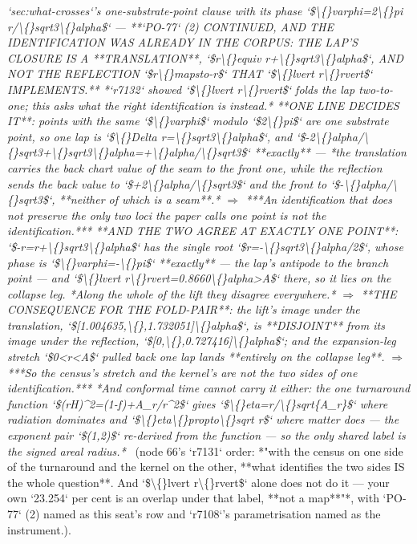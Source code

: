 \begin{description}
\textit{`sec:what-crosses`'s one-substrate-point clause with its phase `\$\textbackslash\{\}varphi=2\textbackslash\{\}pi r/\textbackslash\{\}sqrt3\textbackslash\{\}alpha\$` ---  **`PO-77` (2) CONTINUED, AND THE IDENTIFICATION WAS ALREADY IN THE CORPUS: THE LAP'S CLOSURE IS A **TRANSLATION**, `\$r\textbackslash\{\}equiv r+\textbackslash\{\}sqrt3\textbackslash\{\}alpha\$`, AND NOT THE REFLECTION `\$r\textbackslash\{\}mapsto-r\$` THAT `\$\textbackslash\{\}lvert r\textbackslash\{\}rvert\$` IMPLEMENTS.** *`r7132` showed `\$\textbackslash\{\}lvert r\textbackslash\{\}rvert\$` folds the lap two-to-one; this asks what the right identification is instead.*  **ONE LINE DECIDES IT**: points with the same `\$\textbackslash\{\}varphi\$` modulo `\$2\textbackslash\{\}pi\$` are one substrate point, so one lap is `\$\textbackslash\{\}Delta r=\textbackslash\{\}sqrt3\textbackslash\{\}alpha\$`, and `\$-2\textbackslash\{\}alpha/\textbackslash\{\}sqrt3+\textbackslash\{\}sqrt3\textbackslash\{\}alpha=+\textbackslash\{\}alpha/\textbackslash\{\}sqrt3\$` **exactly** --- *the translation carries the back chart value of the seam to the front one, while the reflection sends the back value to `\$+2\textbackslash\{\}alpha/\textbackslash\{\}sqrt3\$` and the front to `\$-\textbackslash\{\}alpha/\textbackslash\{\}sqrt3\$`, **neither of which is a seam**.* \ensuremath{\Rightarrow} ***An identification that does not preserve the only two loci the paper calls one point is not the identification.***  **AND THE TWO AGREE AT EXACTLY ONE POINT**: `\$-r=r+\textbackslash\{\}sqrt3\textbackslash\{\}alpha\$` has the single root `\$r=-\textbackslash\{\}sqrt3\textbackslash\{\}alpha/2\$`, whose phase is `\$\textbackslash\{\}varphi=-\textbackslash\{\}pi\$` **exactly** --- the lap's antipode to the branch point --- and `\$\textbackslash\{\}lvert r\textbackslash\{\}rvert=0.8660\textbackslash\{\}alpha>A\$` there, so it lies on the collapse leg. *Along the whole of the lift they disagree everywhere.* \ensuremath{\Rightarrow} **THE CONSEQUENCE FOR THE FOLD-PAIR**: the lift's image under the translation, `\$[1.004635,\textbackslash\{\},1.732051]\textbackslash\{\}alpha\$`, is **DISJOINT** from its image under the reflection, `\$[0,\textbackslash\{\},0.727416]\textbackslash\{\}alpha\$`; and the expansion-leg stretch `\$0<r<A\$` pulled back one lap lands **entirely on the collapse leg**. \ensuremath{\Rightarrow} ***So the census's stretch and the kernel's are not the two sides of one identification.***  *And conformal time cannot carry it either: the one turnaround function `\$(rH)\textasciicircum{}2=(1-f)+A\_r/r\textasciicircum{}2\$` gives `\$\textbackslash\{\}eta=r/\textbackslash\{\}sqrt\{A\_r\}\$` where radiation dominates and `\$\textbackslash\{\}eta\textbackslash\{\}propto\textbackslash\{\}sqrt r\$` where matter does --- the exponent pair `\$(1,2)\$` re-derived from the function --- so the only shared label is the signed areal radius.*} \ (node 66's `r7131` order: *"with the census on one side of the turnaround and the kernel on the other, **what identifies the two sides IS the whole question**. And `\$\textbackslash\{\}lvert r\textbackslash\{\}rvert\$` alone does not do it --- your own `23.254` per cent is an overlap under that label, **not a map**"*, with `PO-77` (2) named as this seat's row and `r7108`'s parametrisation named as the instrument.). 

\end{description}
